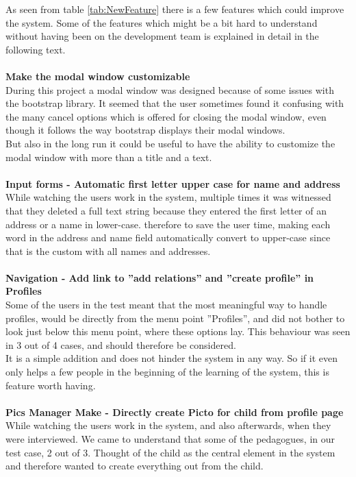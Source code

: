 As seen from table \ref{tab:NewFeature} there is a few features which could improve the system. Some of the features which might be a bit hard to understand without having been on the development team is explained in detail in the following text.\\
\\
\textbf{Make the modal window customizable}\\
During this project a modal window was designed because of some issues with the bootstrap library. It seemed that the user sometimes found it confusing with the many cancel options which is offered for closing the modal window, even though it follows the way bootstrap displays their modal windows.\\
But also in the long run it could be useful to have the ability to customize the modal window with more than a title and a text.\\
\\
\textbf{Input forms - Automatic first letter upper case for name and address}\\
While watching the users work in the system, multiple times it was witnessed that they deleted a full text string because they entered the first letter of an address or a name in lower-case. therefore to save the user time, making each word in the address and name field automatically convert to upper-case since that is the custom with all names and addresses.\\
\\
\textbf{Navigation - Add link to ''add relations'' and ''create profile'' in Profiles}\\
Some of the users in the test meant that the most meaningful way to handle profiles, would be directly from the menu point ''Profiles'', and did not bother to look just below this menu point, where these options lay. This behaviour was seen in 3 out of 4 cases, and should therefore be considered.\\
It is a simple addition and does not hinder the system in any way. So if it even only helps a few people in the beginning of the learning of the system, this is feature worth having.\\
\\
\textbf{Pics Manager Make - Directly create Picto for child from profile page}\\
While watching the users work in the system, and also afterwards, when they were interviewed. We came to understand that some of the pedagogues, in our test case, 2 out of 3. Thought of the child as the central element in the system and therefore wanted to create everything out from the child.\\
